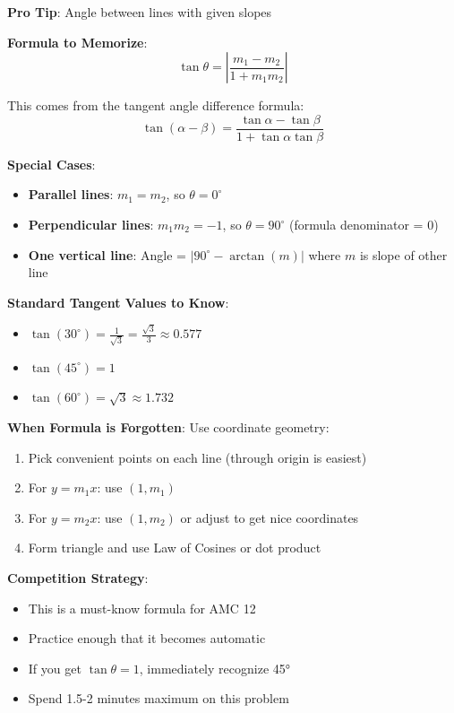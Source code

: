 \documentclass[12pt]{article}
\begin{document}
\begin{tipbox}
\textbf{Pro Tip}: Angle between lines with given slopes

\textbf{Formula to Memorize}:
$$\tan\theta = \left|\frac{m_1 - m_2}{1 + m_1 m_2}\right|$$

This comes from the tangent angle difference formula:
$$\tan(\alpha - \beta) = \frac{\tan\alpha - \tan\beta}{1 + \tan\alpha\tan\beta}$$

\textbf{Special Cases}:
\begin{itemize}
    \item \textbf{Parallel lines}: $m_1 = m_2$, so $\theta = 0^\circ$
    \item \textbf{Perpendicular lines}: $m_1 m_2 = -1$, so $\theta = 90^\circ$ (formula denominator = 0)
    \item \textbf{One vertical line}: Angle = $|90^\circ - \arctan(m)|$ where $m$ is slope of other line
\end{itemize}

\textbf{Standard Tangent Values to Know}:
\begin{itemize}
    \item $\tan(30^\circ) = \frac{1}{\sqrt{3}} = \frac{\sqrt{3}}{3} \approx 0.577$
    \item $\tan(45^\circ) = 1$
    \item $\tan(60^\circ) = \sqrt{3} \approx 1.732$
\end{itemize}

\textbf{When Formula is Forgotten}:
Use coordinate geometry:
\begin{enumerate}
    \item Pick convenient points on each line (through origin is easiest)
    \item For $y = m_1x$: use $(1, m_1)$
    \item For $y = m_2x$: use $(1, m_2)$ or adjust to get nice coordinates
    \item Form triangle and use Law of Cosines or dot product
\end{enumerate}

\textbf{Competition Strategy}:
\begin{itemize}
    \item This is a must-know formula for AMC 12
    \item Practice enough that it becomes automatic
    \item If you get $\tan\theta = 1$, immediately recognize 45°
    \item Spend 1.5-2 minutes maximum on this problem
\end{itemize}
\end{tipbox}
\end{document}
